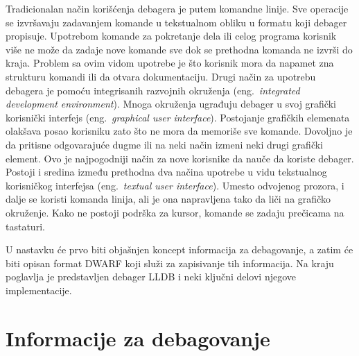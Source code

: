 \documentclass[12pt,oneside]{memoir}
\begin{document}

Tradicionalan način korišćenja debagera je putem komandne linije.
Sve operacije se izvršavaju zadavanjem komande u tekstualnom obliku u formatu koji debager propisuje.
Upotrebom komande za pokretanje dela ili celog programa korisnik više ne može da zadaje nove komande sve dok se prethodna komanda ne izvrši do kraja.
Problem sa ovim vidom upotrebe je što korisnik mora da napamet zna strukturu komandi ili da otvara dokumentaciju.
Drugi način za upotrebu debagera je pomoću integrisanih razvojnih okruženja (eng.~{\em integrated development environment}).
Mnoga okruženja ugrađuju debager u svoj grafički korisnički interfejs (eng.~{\em graphical user interface}).
Postojanje grafičkih elemenata olakšava posao korisniku zato što ne mora da memoriše sve komande.
Dovoljno je da pritisne odgovarajuće dugme ili na neki način izmeni neki drugi grafički element.
Ovo je najpogodniji način za nove korisnike da nauče da koriste debager.
Postoji i sredina između prethodna dva načina upotrebe u vidu tekstualnog korisničkog interfejsa (eng.~{\em textual user interface}).
Umesto odvojenog prozora, i dalje se koristi komanda linija, ali je ona napravljena tako da liči na grafičko okruženje.
Kako ne postoji podrška za kursor, komande se zadaju prečicama na tastaturi.

U nastavku će prvo biti objašnjen koncept informacija za debagovanje, a zatim će biti opisan format DWARF koji služi za zapisivanje tih informacija.
Na kraju poglavlja je predstavljen debager LLDB i neki ključni delovi njegove implementacije.

\section{Informacije za debagovanje}
\label{sec:informacije_za_debagovanje}


\end{document}
